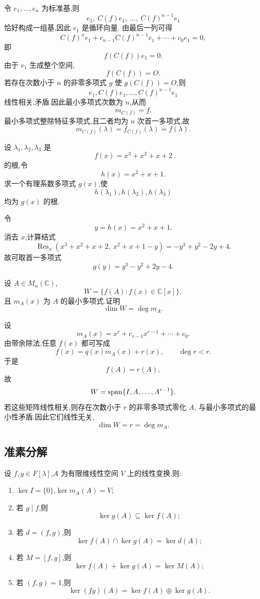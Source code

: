 \begin{solution}
令 $e_1,\ldots,e_n$ 为标准基,则
\[
e_1,\ C(f)e_1,\ \ldots,\ C(f)^{n-1}e_1
\]
恰好构成一组基,因此 $e_1$ 是循环向量.
由最后一列可得
\[
C(f)^ne_1
+c_{n-1}C(f)^{n-1}e_1+\cdots+c_0e_1=0,
\]
即
\[
f(C(f))e_1=0.
\]
由于 $e_1$ 生成整个空间,
\[
f(C(f))=O.
\]
若存在次数小于 $n$ 的非零多项式 $g$ 使 $g(C(f))=O$,则
\[
e_1,C(f)e_1,\ldots,C(f)^{n-1}e_1
\]
线性相关,矛盾.因此最小多项式次数为 $n$,从而
\[
m_{C(f)}=f.
\]
最小多项式整除特征多项式,且二者均为 $n$ 次首一多项式,故
\[
\boxed{m_{C(f)}(\lambda)=f_{C(f)}(\lambda)=f(\lambda)}.
\]
\end{solution}


\begin{example}
设 $\lambda_1,\lambda_2,\lambda_3$ 是
\[
f(x)=x^3+x^2+x+2
\]
的根,令
\[
h(x)=x^2+x+1.
\]
求一个有理系数多项式 $g(x)$,使
\[
h(\lambda_1),h(\lambda_2),h(\lambda_3)
\]
均为 $g(x)$ 的根.
\end{example}
\exampleblank

\begin{solution}
令
\[
y=h(x)=x^2+x+1.
\]
消去 $x$,计算结式
\[
\operatorname{Res}_x
\left(x^3+x^2+x+2,\ x^2+x+1-y\right)
=
-y^3+y^2-2y+4.
\]
故可取首一多项式
\[
\boxed{g(y)=y^3-y^2+2y-4}.
\]
\end{solution}


\begin{example}[\markstar]
设 $A\in M_n(\mathbb{C})$,
\[
W=\{f(A):f(x)\in\mathbb{C}[x]\},
\]
且 $m_A(x)$ 为 $A$ 的最小多项式.证明
\[
\dim W=\deg m_A.
\]
\end{example}
\exampleblank

\begin{solution}
设
\[
m_A(x)=x^r+c_{r-1}x^{r-1}+\cdots+c_0.
\]
由带余除法,任意 $f(x)$ 都可写成
\[
f(x)=q(x)m_A(x)+r(x),
\qquad
\deg r<r.
\]
于是
\[
f(A)=r(A),
\]
故
\[
W=\operatorname{span}\{I,A,\ldots,A^{r-1}\}.
\]
若这些矩阵线性相关,则存在次数小于 $r$ 的非零多项式零化 $A$,
与最小多项式的最小性矛盾.因此它们线性无关,
\[
\boxed{\dim W=r=\deg m_A}.
\]
\end{solution}


\subsection{准素分解}

\begin{lemma}[\markstar]
设 $f,g\in F[\lambda]$,$A$ 为有限维线性空间 $V$ 上的线性变换,则:
\begin{enumerate}
    \item $\ker I=\{0\}$,$\ker m_A(A)=V$;
    \item 若 $g\mid f$,则
    \[
    \ker g(A)\subseteq\ker f(A);
    \]
    \item 若 $d=(f,g)$,则
    \[
    \ker f(A)\cap\ker g(A)=\ker d(A);
    \]
    \item 若 $M=[f,g]$,则
    \[
    \ker f(A)+\ker g(A)=\ker M(A);
    \]
    \item 若 $(f,g)=1$,则
    \[
    \ker(fg)(A)=\ker f(A)\oplus\ker g(A).
    \]
\end{enumerate}
\end{lemma}


